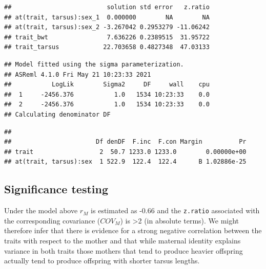 \documentclass[
  12pt,
]{book}
\newenvironment{Shaded}{\begin{snugshade}}{\end{snugshade}}
\newcommand{\AttributeTok}[1]{\textcolor[rgb]{0.77,0.63,0.00}{#1}}
\newcommand{\ConstantTok}[1]{\textcolor[rgb]{0.00,0.00,0.00}{#1}}
\newcommand{\FunctionTok}[1]{\textcolor[rgb]{0.00,0.00,0.00}{#1}}
\newcommand{\NormalTok}[1]{#1}
\newcommand{\SpecialCharTok}[1]{\textcolor[rgb]{0.00,0.00,0.00}{#1}}
\newcommand{\StringTok}[1]{\textcolor[rgb]{0.31,0.60,0.02}{#1}}
\begin{document}
\begin{Shaded}
\end{Shaded}

\begin{verbatim}
##                          solution std error   z.ratio
## at(trait, tarsus):sex_1  0.000000        NA        NA
## at(trait, tarsus):sex_2 -3.267042 0.2953279 -11.06242
## trait_bwt                7.636226 0.2389515  31.95722
## trait_tarsus            22.703658 0.4827348  47.03133
\end{verbatim}

\begin{verbatim}
## Model fitted using the sigma parameterization.
## ASReml 4.1.0 Fri May 21 10:23:33 2021
##           LogLik        Sigma2     DF     wall    cpu
##  1     -2456.376           1.0   1534 10:23:33    0.0
##  2     -2456.376           1.0   1534 10:23:33    0.0
## Calculating denominator DF
\end{verbatim}

\begin{verbatim}
## 
##                       Df denDF  F.inc  F.con Margin          Pr
## trait                  2  50.7 1233.0 1233.0        0.00000e+00
## at(trait, tarsus):sex  1 522.9  122.4  122.4      B 1.02886e-25
\end{verbatim}

\hypertarget{significance-testing}{%
\subsection{Significance testing}\label{significance-testing}}

Under the model above \(r_M\) is estimated as -0.66 and the \texttt{z.ratio} associated with the corresponding covariance (\(COV_M\)) is \textgreater2 (in absolute terms). We might therefore infer that there is evidence for a strong negative correlation between the traits with respect to the mother and that while maternal identity explains variance in both traits those mothers that tend to produce heavier offspring actually tend to produce offspring with shorter tarsus lengths.
\end{document}
